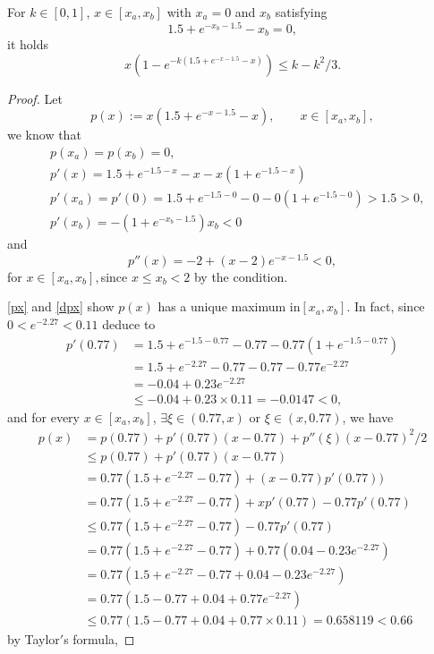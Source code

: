 \documentclass{HZNUMCM}
\begin{document}
\begin{lemma}\label{lowbound}
For $k \in [0,1]$, $x \in [x_a,x_b]$  with $x_a=0$ and $x_b$ satisfying
\begin{equation*}
1.5 + e^{-x_b-1.5} - x_b=0,
\end{equation*}
 it holds
\begin{equation}\label{inequality_lowbound}
x (1 - e^{-k (1.5 + e^{-x-1.5} - x)})\leqslant k - k^2/3.
\end{equation}
\end{lemma}
\begin{proof}Let
$$
p(x) := x  (1.5 + e^{-x-1.5} - x),\qquad x\in[x_a,x_b],
$$ we know that
\begin{equation}\label{px}
\begin{split}
&p(x_a)=p(x_b)=0,\\
&p'(x)= 1.5+e^{-1.5-x}-x-x(1+e^{-1.5-x}) \\
&p'(x_a)=p'(0)=1.5+e^{-1.5-0}-0-0(1+e^{-1.5-0})>1.5 >0,\\
&p'(x_b)=-(1 + e^{-x_b-1.5}) x_b<0
\end{split}
\end{equation}and
\begin{equation}\label{dpx}
p''(x)=-2+(x-2)e^{-x-1.5}<0,
\end{equation}
for $x\in[x_a,x_b], $since $x\leqslant x_b<2$ by the condition.

\eqref{px} and \eqref{dpx} show $p(x)$ has a unique maximum in$[x_a,x_b]$. In fact,  since $0<e^{-2.27}<0.11$ deduce to
\begin{equation}
\begin{split}
p'(0.77)&=  1.5 + e^{-1.5-0.77} -0.77-0.77(1+e^{-1.5-0.77} )\\
&= 1.5 + e^{-2.27} -0.77-0.77-0.77e^{-2.27} \\
&=-0.04+0.23e^{-2.27}\\
&\leqslant-0.04+0.23\times 0.11=-0.0147<0,
\end{split}\end{equation}
and for every $x\in [x_a,x_b]$, $\exists\xi\in(0.77,x)\mbox{~or~}\xi\in(x,0.77)$, we have
\begin{equation} \label{px<0.66}
\begin{split}
p(x)&=p(0.77)+p'(0.77)(x-0.77)+p''(\xi){(x-0.77)^2}/2\\
&\leqslant p(0.77)+p'(0.77)(x-0.77)\\
&= 0.77 (1.5 + e^{-2.27} -0.77)+(x-0.77)p'(0.77))\\
&= 0.77 (1.5 + e^{-2.27} -0.77)+x p'(0.77)-0.77p'(0.77)\\
&\leqslant  0.77 (1.5 + e^{-2.27} -0.77) -0.77 p'(0.77)\\
&= 0.77 (1.5 + e^{-2.27} -0.77)+0.77(0.04-0.23e^{-2.27} )\\
&= 0.77 (1.5 + e^{-2.27} -0.77+0.04-0.23e^{-2.27} )\\
&= 0.77 (1.5  -0.77+0.04+0.77e^{-2.27} )\\
&\leqslant 0.77 (1.5 - 0.77 + 0.04 + 0.77 \times 0.11)=0.658119<0.66
\end{split}\end{equation}
by Taylor$'$s formula,



\end{proof}
\end{document}
